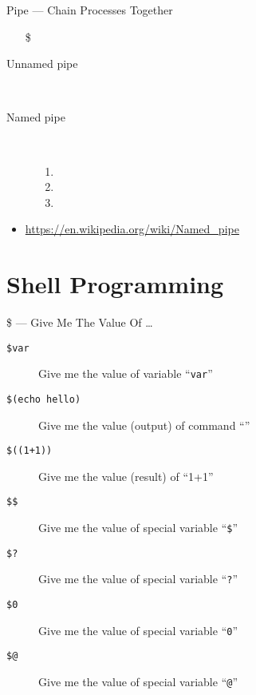 \begin{frame}{Pipe --- Chain Processes Together}
  \begin{itemize}
  \item[\$] 
  \end{itemize}
  \begin{center}
  \end{center}
  \begin{description}
  \item[Unnamed pipe] \,\\
  \item[Named pipe] \,\\
    \begin{enumerate}
    \item {}
    \item {}
    \item {}
    \end{enumerate}
  \end{description}
\end{frame}

\begin{itemize}
\item \url{https://en.wikipedia.org/wiki/Named_pipe}
\end{itemize}

\section{Shell Programming}
\label{sec:shell-programming}

\begin{frame}{\$ --- Give Me The Value Of \ldots}
  \begin{description}
  \item[\texttt{\$var}] Give me the value of variable ``\texttt{var}''
  \item[\texttt{\$(echo hello)}] Give me the value (output) of command ``''
  \item[\texttt{\$((1+1))}] Give me the value (result) of ``1+1''
  \item[\texttt{\$\$}] Give me the value of special variable ``\texttt{\$}''
  \item[\texttt{\$?}] Give me the value of special variable ``\texttt{?}''
  \item[\texttt{\$0}] Give me the value of special variable ``\texttt{0}''
  \item[\texttt{\$@}] Give me the value of special variable ``\texttt{@}''
  \end{description}
\end{frame}

